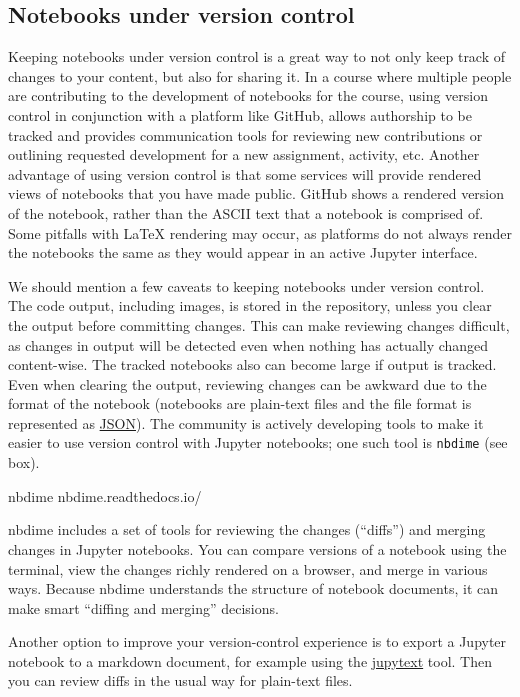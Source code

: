 \documentclass[]{book}
\let\BeginKnitrBlock\begin \let\EndKnitrBlock\end
\begin{document}
\hypertarget{notebooks-under-version-control}{%
\subsection{Notebooks under version control}\label{notebooks-under-version-control}}

Keeping notebooks under version control is a great way to not only
keep track of changes to your content, but also for
sharing it. In a course where multiple people are contributing
to the development of notebooks for the course, using version control
in conjunction with a platform like GitHub, allows authorship to be
tracked and provides communication tools for reviewing new
contributions or outlining requested development for a new assignment,
activity, etc. Another advantage of using version control is that
some services will provide rendered views of notebooks
that you have made public. GitHub shows a rendered
version of the notebook, rather than the ASCII text that a notebook is
comprised of. Some pitfalls with LaTeX rendering may occur,
as platforms do not always render the notebooks the same as they would
appear in an active Jupyter interface.

We should mention a few caveats to keeping notebooks under version control.
The code output, including images, is stored
in the repository, unless you clear the output
before committing changes. This can make reviewing changes difficult,
as changes in output will be detected even when nothing has actually
changed content-wise. The tracked notebooks also can become large if
output is tracked. Even when clearing the output, reviewing
changes can be awkward due to the format of the notebook (notebooks
are plain-text files and the file format is represented as
\href{https://www.json.org/}{JSON}).
The community is actively developing tools to make it easier to use version control with Jupyter notebooks; one such tool is \texttt{nbdime} (see box).

\BeginKnitrBlock{rmdnote}
nbdime nbdime.readthedocs.io/

nbdime includes a set of tools for reviewing the changes (``diffs'') and
merging changes in Jupyter notebooks. You can compare versions of a
notebook using the terminal, view the changes richly rendered on a
browser, and merge in various ways. Because nbdime understands the
structure of notebook documents, it can make smart ``diffing and
merging'' decisions.
\EndKnitrBlock{rmdnote}

Another option to improve your version-control experience is to export
a Jupyter notebook to a markdown document, for example using the \href{https://github.com/mwouts/jupytext}{jupytext} tool.
Then you can review diffs in the usual way for plain-text files.
\end{document}
